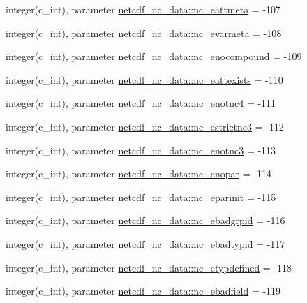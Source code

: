 \begin{DoxyCompactItemize}
\item 
integer(c\+\_\+int), parameter \hyperlink{namespacenetcdf__nc__data_a26356b327c9de1414e34445334d3fcad}{netcdf\+\_\+nc\+\_\+data\+::nc\+\_\+eattmeta} = -\/107
\item 
integer(c\+\_\+int), parameter \hyperlink{namespacenetcdf__nc__data_aa1c9018bd64fdff140ce7bbf2b2408ff}{netcdf\+\_\+nc\+\_\+data\+::nc\+\_\+evarmeta} = -\/108
\item 
integer(c\+\_\+int), parameter \hyperlink{namespacenetcdf__nc__data_a9253ff8006f31d3554d0d462ccd2480e}{netcdf\+\_\+nc\+\_\+data\+::nc\+\_\+enocompound} = -\/109
\item 
integer(c\+\_\+int), parameter \hyperlink{namespacenetcdf__nc__data_ad0ebf9a9a2d73ffe3587ea832e5a0f68}{netcdf\+\_\+nc\+\_\+data\+::nc\+\_\+eattexists} = -\/110
\item 
integer(c\+\_\+int), parameter \hyperlink{namespacenetcdf__nc__data_a2be3d7ec691b7c8803115abebe6bac27}{netcdf\+\_\+nc\+\_\+data\+::nc\+\_\+enotnc4} = -\/111
\item 
integer(c\+\_\+int), parameter \hyperlink{namespacenetcdf__nc__data_a31d4e1a356ae4e6fc421a82870a3db6e}{netcdf\+\_\+nc\+\_\+data\+::nc\+\_\+estrictnc3} = -\/112
\item 
integer(c\+\_\+int), parameter \hyperlink{namespacenetcdf__nc__data_af7cee79d1f60767652c5a80ad1917aed}{netcdf\+\_\+nc\+\_\+data\+::nc\+\_\+enotnc3} = -\/113
\item 
integer(c\+\_\+int), parameter \hyperlink{namespacenetcdf__nc__data_aef244b9b47636b8dbe5895eca0b18136}{netcdf\+\_\+nc\+\_\+data\+::nc\+\_\+enopar} = -\/114
\item 
integer(c\+\_\+int), parameter \hyperlink{namespacenetcdf__nc__data_aafdc94b9d4b9e1d38989f30e1854a9f0}{netcdf\+\_\+nc\+\_\+data\+::nc\+\_\+eparinit} = -\/115
\item 
integer(c\+\_\+int), parameter \hyperlink{namespacenetcdf__nc__data_a016aacc26702e1653ed70acc2fe43f80}{netcdf\+\_\+nc\+\_\+data\+::nc\+\_\+ebadgrpid} = -\/116
\item 
integer(c\+\_\+int), parameter \hyperlink{namespacenetcdf__nc__data_aacaa397d41962ebba916f042f0f53759}{netcdf\+\_\+nc\+\_\+data\+::nc\+\_\+ebadtypid} = -\/117
\item 
integer(c\+\_\+int), parameter \hyperlink{namespacenetcdf__nc__data_a0b666565d2bf5ba2a238201461c372bb}{netcdf\+\_\+nc\+\_\+data\+::nc\+\_\+etypdefined} = -\/118
\item 
integer(c\+\_\+int), parameter \hyperlink{namespacenetcdf__nc__data_a0cbc5e39141140f6ae945c7f1051cadb}{netcdf\+\_\+nc\+\_\+data\+::nc\+\_\+ebadfield} = -\/119

\end{DoxyCompactItemize}
